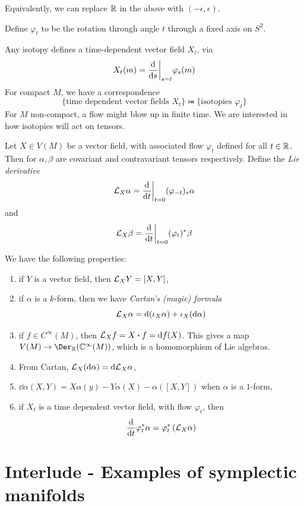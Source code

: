 \documentclass{article}
\begin{document}
Equivalently, we can replace \(\mathbb{R}\) in the above with \((-\epsilon, \epsilon)\).

\begin{example}
    Define \(\varphi_t\) to be the rotation through angle \(t\) through a fixed axis on \(S^2\).
\end{example}

Any isotopy defines a time-dependent vector field \(X_t\), via
\[X_{t}(m) = \dv{s}\bigg\vert_{s = t}\varphi_s(m)\]
For compact \(M\), we have a correspondence
\[\{\text{time dependent vector fields } X_t\} \bij \{\text{isotopies }\varphi_t\}\]
For \(M\) non-compact, a flow might blow up in finite time. We are interested in how isotopies will act on tensors.

Let \(X \in V(M)\) be a vector field, with associated flow \(\varphi_t\) defined for all \(t \in \mathbb{R}\). Then for \(\alpha, \beta\) are covariant and contravariant tensors respectively. Define the \emph{Lie derivative}
\[\mathcal{L}_X\alpha = \dv{t}\bigg\vert_{t=0}(\varphi_{-t})_*\alpha\]
and
\[\mathcal{L}_X\beta = \dv{t}\bigg\vert_{t=0}(\varphi_t)^*\beta\]

We have the following properties:
\begin{proposition}
    \begin{enumerate}
        \item if \(Y\) is a vector field, then \(\mathcal{L}_XY = [X, Y]\),
        \item if \(\alpha\) is a \(k\)-form, then we have \emph{Cartan's (magic) formula}
        \[\mathcal{L}_X\alpha = \dd(\iota_X\alpha) + \iota_X(\dd\alpha)\]
        \item if \(f \in C^\infty(M)\), then \(\mcL_X f = X \vdot f = \dd f(X)\). This gives a map \(V(M) \to \Der_\R(\C^\infty(M))\), which is a homomorphism of Lie algebras.
        \item From Cartan, \(\mathcal{L}_X(\dd \alpha) = \dd\mathcal{L}_X\alpha\),
        \item \(\dd\alpha(X, Y) = X\alpha(y) - Y\alpha(X) - \alpha([X, Y])\) when \(\alpha\) is a \(1\)-form,
        \item if \(X_t\) is a time dependent vector field, with flow \(\varphi_t\), then
        \[\dv{t}\varphi^*_t\alpha = \varphi_t^*\left(\mathcal{L}_X\alpha\right)\]
    \end{enumerate}
\end{proposition}

\lec

\section{Interlude - Examples of symplectic manifolds}
\end{document}
